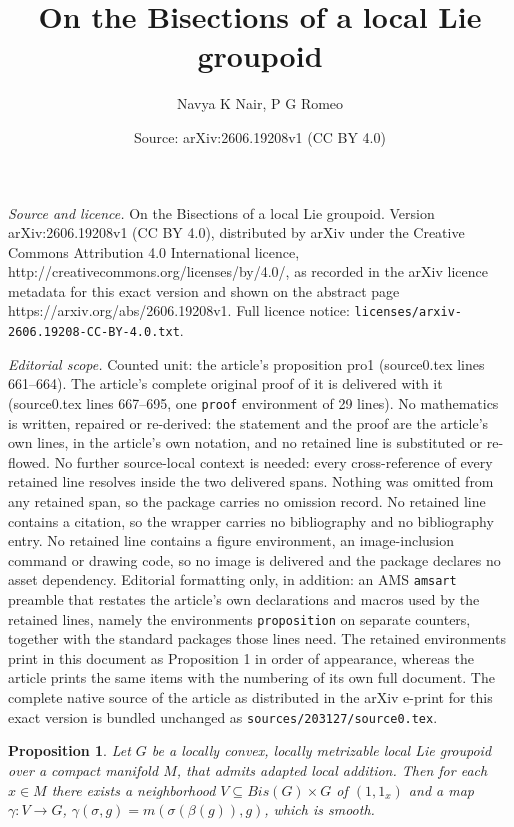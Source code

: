 \documentclass[10pt,a4paper]{amsart}
\title{On the Bisections of a local Lie groupoid}
\author{Navya K Nair, P G Romeo}
\date{Source: arXiv:2606.19208v1 (CC BY 4.0)}
\newtheorem{proposition}{Proposition}
\begin{document}
\maketitle

\noindent\emph{Source and licence.} On the Bisections of a local Lie groupoid. Version arXiv:2606.19208v1 (CC BY 4.0), distributed by arXiv under the Creative Commons Attribution 4.0 International licence, http://creativecommons.org/licenses/by/4.0/, as recorded in the arXiv licence metadata for this exact version and shown on the abstract page https://arxiv.org/abs/2606.19208v1. Full licence notice: \texttt{licenses/arxiv-2606.19208-CC-BY-4.0.txt}.\par\smallskip

\noindent\textit{Editorial scope.} Counted unit: the article's proposition pro1 (source0.tex lines 661--664). The article's complete original proof of it is delivered with it (source0.tex lines 667--695, one \texttt{proof} environment of 29 lines). No mathematics is written, repaired or re-derived: the statement and the proof are the article's own lines, in the article's own notation, and no retained line is substituted or re-flowed.  No further source-local context is needed: every cross-reference of every retained line resolves inside the two delivered spans.  Nothing was omitted from any retained span, so the package carries no omission record.  No retained line contains a citation, so the wrapper carries no bibliography and no bibliography entry.  No retained line contains a figure environment, an image-inclusion command or drawing code, so no image is delivered and the package declares no asset dependency.  Editorial formatting only, in addition: an AMS \texttt{amsart} preamble that restates the article's own declarations and macros used by the retained lines, namely the environments \texttt{proposition} on separate counters, together with the standard packages those lines need.  The retained environments print in this document as Proposition 1 in order of appearance, whereas the article prints the same items with the numbering of its own full document.  The complete native source of the article as distributed in the arXiv e-print for this exact version is bundled unchanged as \texttt{sources/203127/source0.tex}.
\begin{proposition} \label{pro1}
Let $G$ be a locally convex, locally metrizable local Lie groupoid over a compact manifold $M$, that admits adapted local addition. Then for each $x\in M$ there exists a  neighborhood $V\subseteq Bis(G)\times G$ of $(1,1_x)$  and a map 
$\gamma: V \rightarrow G$, $\gamma(\sigma,g)= m(\sigma(\beta(g)),g)$, which is smooth.
\end{proposition}
\end{document}
